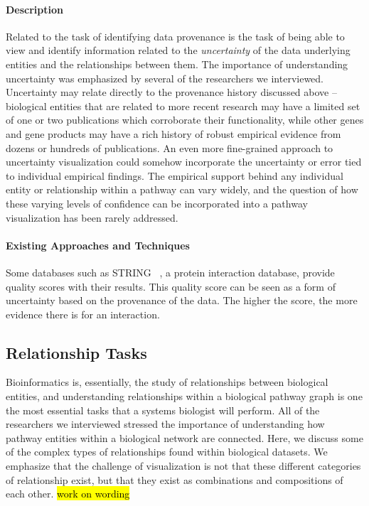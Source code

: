 \paragraph*{Description}
Related to the task of identifying data provenance is the task of being able to view and identify information related to the \textit{uncertainty} of the data underlying entities and the relationships between them.
The importance of understanding uncertainty was emphasized by several of the researchers we interviewed.
Uncertainty may relate directly to the provenance history discussed above -- biological entities that are related to more recent research may have a limited set of one or two publications which corroborate their functionality, while other genes and gene products may have a rich history of robust empirical evidence from dozens or hundreds of publications.
An even more fine-grained approach to uncertainty visualization could somehow incorporate the uncertainty or error tied to individual empirical findings.
The empirical support behind any individual entity or relationship within a pathway can vary widely, and the question of how these varying levels of confidence can be incorporated into a pathway visualization has been rarely addressed.

\paragraph*{Existing Approaches and Techniques}
Some databases such as STRING~\cite{STRING2005} , a protein interaction database, provide quality scores with their results. This quality score can be seen as a form of uncertainty based on the provenance of the data.
The higher the score, the more evidence there is for an interaction.

\subsection*{Relationship Tasks}
Bioinformatics is, essentially, the study of relationships between biological entities, and understanding relationships within a biological pathway graph is one the most essential tasks that a systems biologist will perform.
All of the researchers we interviewed stressed the importance of understanding how pathway entities within a biological network are connected.
Here, we discuss some of the complex types of relationships found within biological datasets.
We emphasize that the challenge of visualization is not that these different categories of relationship exist, but that they exist as combinations and compositions of each other. \hl{work on wording}

